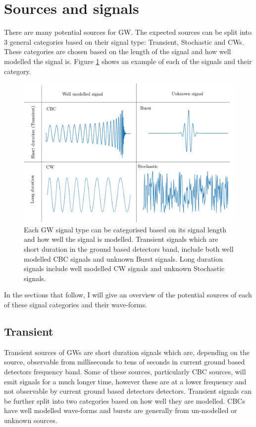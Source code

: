 \section{\label{intro:sources}Sources and signals}

There are many potential sources for \gls{GW}. The expected sources can be split into 3 general categories based on their signal type: Transient, Stochastic and \glspl{CW}.
These categories are chosen based on the length of the signal and how well modelled the signal is.
Figure \ref{intro:sources:signaltypes} shows an example of each of the signals and their category.
%
\begin{figure}[h]
    \centering
    \includegraphics[width=\textwidth]{C1_intro/sources_types.pdf}
    \caption[GW signal types]{Each \gls{GW} signal type can be categorised based on its signal length and how well the signal is modelled. Transient signals which are short duration in the ground based detectors band, include both well modelled \gls{CBC} signals and unknown Burst signals. Long duration signals include well modelled \gls{CW} signals and unknown Stochastic signals.}
    \label{intro:sources:signaltypes}
\end{figure}
In the sections that follow, I will give an overview of the potential sources of each of these signal categories and their wave-forms.


\subsection{\label{sources:transient}Transient}

Transient sources of \glspl{GW} are short duration signals which are, depending on the source, observable from milliseconds to tens of seconds in current ground based detectors frequency band. 
Some of these sources, particularly \gls{CBC} sources, will emit signals for a much longer time, however these are at a lower frequency and not observable by current ground based detectors detectors.
Transient signals can be further split into two categories based on how well they are modelled. 
\glspl{CBC} have well modelled wave-forms and bursts are generally from un-modelled or unknown sources.

